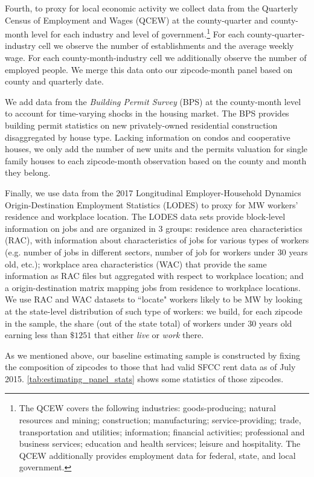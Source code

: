 Fourth, to proxy for local economic activity we collect data from the Quarterly Census of Employment 
and Wages (QCEW) at the county-quarter and county-month level for each industry and level of 
government.\footnote{The QCEW covers the following industries: goods-producing; natural resources and 
	mining; construction; manufacturing; service-providing; trade, transportation and utilities; 
	information; financial activities; professional and business services; education and health 
	services; leisure and hospitality. The QCEW additionally provides employment data for federal, 
	state, and local government.} 
For each county-quarter-industry cell we observe the number of establishments and the average weekly 
wage. For each county-month-industry cell we additionally observe the number of employed people. We 
merge this data onto our zipcode-month panel based on county and quarterly date.

We add data from the \textit{Building Permit Survey} (BPS) at the county-month level to account for 
time-varying shocks in the housing market. The BPS provides building permit statistics on new 
privately-owned residential construction disaggregated by house type. Lacking information on condos 
and cooperative houses, we only add the number of new units and the permits valuation for single 
family houses to each zipcode-month observation based on the county and month they belong. 

Finally, we use data from the 2017 Longitudinal Employer-Household Dynamics Origin-Destination 
Employment Statistics (LODES) to proxy for MW workers' residence and workplace location. The LODES 
data sets provide block-level information on jobs and are organized in 3 groups: residence area 
characteristics (RAC), with information about characteristics of jobs for various types of workers 
(e.g. number of jobs in different sectors, number of job for workers under 30 years old, etc.); 
workplace area characteristics (WAC) that provide the same information as RAC files but aggregated 
with respect to workplace location; and a origin-destination matrix mapping jobs from residence to 
workplace locations. We use RAC and WAC datasets to ``locate" workers likely to be MW by looking at 
the state-level distribution of such type of workers: we build, for each zipcode in the sample, the 
share (out of the state total) of workers under 30 years old earning less than $\$1251$ that either 
\textit{live} or \textit{work} there. 

As we mentioned above, our baseline estimating sample is constructed by fixing the composition of 
zipcodes to those that had valid SFCC rent data as of July 2015. \autoref{tab:estimating_panel_stats}
shows some statistics of those zipcodes. %

